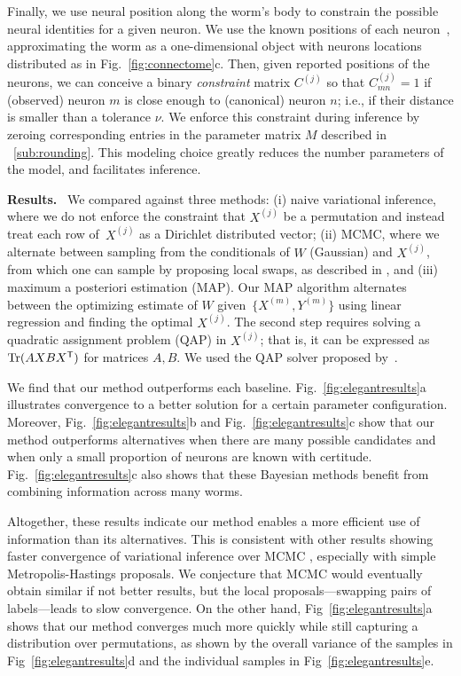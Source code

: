 \documentclass[twoside]{article}
\DeclareRobustCommand{\parhead}[1]{\textbf{#1}~}
\begin{document}
Finally, we use neural position along the worm's body to constrain the
possible neural identities for a given neuron.  We use the known
positions of each neuron~\citep{wormatlas}, approximating the worm as
a one-dimensional object with neurons locations distributed as in
Fig.~\ref{fig:connectome}c. Then, given reported positions of the
neurons, we can conceive a binary \textit{constraint} matrix $C^{(j)}$
so that $C^{(j)}_{mn}=1$ if (observed) neuron $m$ is close enough to
(canonical) neuron $n$; i.e., if their distance is smaller than a
tolerance $\nu$. We enforce this constraint during inference by
zeroing corresponding entries in the parameter matrix $M$ described in
~\ref{sub:rounding}.  This modeling choice greatly reduces the number
parameters of the model, and facilitates inference.

\parhead{Results.} We compared against three methods: (i) naive
variational inference, where we do not enforce the constraint that
$X^{(j)}$ be a permutation and instead treat each row of~$X^{(j)}$ as
a Dirichlet distributed vector; (ii) MCMC, where we alternate between
sampling from the conditionals of $W$ (Gaussian) and ${X^{(j)}}$, from
which one can sample by proposing local swaps, as described in
\cite{Diaconis2009}, and (iii) maximum a posteriori estimation (MAP).
Our MAP algorithm alternates between the optimizing estimate of $W$
given~$\{X^{(m)}, Y^{(m)}\}$ using linear regression and finding the
optimal ${X^{(j)}}$. The second step requires solving a quadratic
assignment problem (QAP) in ${X^{(j)}}$; that is, it can be expressed
as $\mathrm{Tr}(AXBX^{\mathsf{T}})$ for matrices $A,B$. We used the QAP
solver proposed by~\citet{Vogelstein2015}.


We find that our method outperforms each
baseline. Fig.~\ref{fig:elegantresults}a illustrates convergence to a
better solution for a certain parameter configuration. Moreover,
Fig.~\ref{fig:elegantresults}b and Fig.~\ref{fig:elegantresults}c show
that our method outperforms alternatives when there are many possible
candidates and when only a small proportion of neurons are known with
certitude. Fig.~\ref{fig:elegantresults}c also shows that these
Bayesian methods benefit from combining information across many worms.

Altogether, these results indicate our method enables a more efficient
use of information than its alternatives. This is consistent with
other results showing faster convergence of variational inference over
MCMC \citep{Blei2017}, especially with simple Metropolis-Hastings
proposals. We conjecture that MCMC would eventually obtain similar if
not better results, but the local proposals---swapping pairs of
labels---leads to slow convergence. On the other hand,
Fig~\ref{fig:elegantresults}a shows that our method converges much
more quickly while still capturing a distribution over permutations,
as shown by the overall variance of the samples in
Fig~\ref{fig:elegantresults}d and the individual samples in
Fig~\ref{fig:elegantresults}e.
\end{document}
